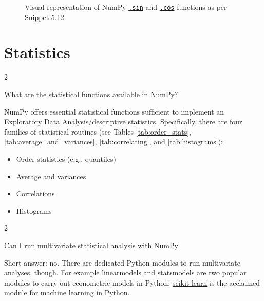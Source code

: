 \documentclass[a4paper,11pt]{book}
\newcommand{\question}[1]{%
    \begin{tcolorbox}[colback=comp_c!10,colframe=comp_c,sidebyside align=top,width=\linewidth,before skip=1ex]
        #1
    \end{tcolorbox}
    \switchcolumn%
}
\newcommand{\note}[1]{%
    \begin{tcolorbox}[colback=white!0,colframe=white!10,width=\linewidth,before skip=1ex]
        #1
    \end{tcolorbox}
}
\begin{document}
\begin{figure}[!htbp]
	\centering
	
	
	\caption{Visual representation of NumPy \href{https://numpy.org/doc/stable/reference/generated/numpy.sin.html\#numpy.sin}{\texttt{.sin}} and \href{https://numpy.org/doc/stable/reference/generated/numpy.cos.html\#numpy.cos}{\texttt{.cos}} functions as per Snippet 5.12.}
\end{figure}

\section{Statistics}

\begin{paracol}{2}
	\question{\raggedright What are the statistical functions available in NumPy?}
	\note{NumPy offers essential statistical functions sufficient to implement an Exploratory Data Analysis/descriptive statistics. Specifically, there are four families of statistical routines (see Tables \ref{tab:order_stats}, \ref{tab:average_and_variances}, \ref{tab:correlating}, and \ref{tab:histograms}):
	
	\begin{itemize}
		\item Order statistics (e.g., quantiles)
		\item Average and variances
		\item Correlations 
		\item Histograms
	\end{itemize}
	}
\end{paracol}

\begin{paracol}{2}
	\question{\raggedright Can I run multivariate statistical analysis with NumPy}
	\note{Short answer: no. There are dedicated Python modules to run multivariate analyses, though. For example \href{https://bashtage.github.io/linearmodels/index.html}{linearmodels} and \href{https://www.statsmodels.org/stable/generated/statsmodels.sandbox.regression.gmm.IV2SLS.html?highlight=2sls\#statsmodels.sandbox.regression.gmm.IV2SLS}{statsmodels} are two popular modules to carry out econometric models in Python; \href{https://scikit-learn.org/stable/}{scikit-learn} is the acclaimed module for machine learning in Python.}
\end{paracol}
\clearpage
\end{document}
